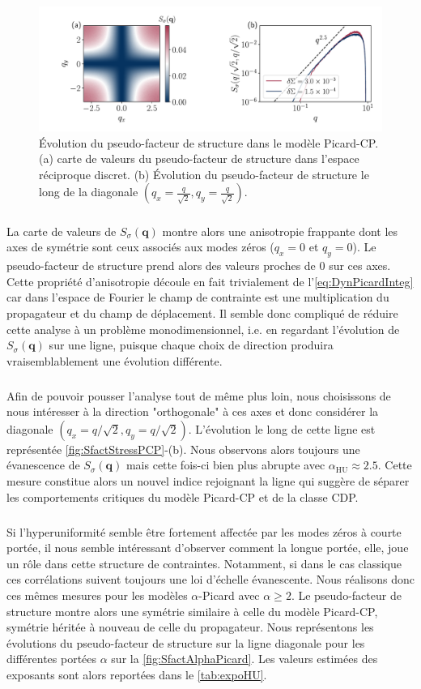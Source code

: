 \begin{figure}[h]
	\centering
	\includegraphics[width=\textwidth]{Chapitre4/Figures/Correlations/Sfact_SRP.pdf}
	\caption{Évolution du pseudo-facteur de structure dans le modèle Picard-CP. (a) carte de valeurs du pseudo-facteur de structure dans l'espace réciproque discret. (b) Évolution du pseudo-facteur de structure le long de la diagonale $(q_x=\frac{q}{\sqrt{2}},q_y=\frac{q}{\sqrt{2}})$.}
	\label{fig:SfactStressPCP}
\end{figure}

\subparagraph{}La carte de valeurs de $S_\sigma(\mathbf{q})$ montre alors une anisotropie frappante dont les axes de symétrie sont ceux associés aux modes zéros ($q_x=0$ et $q_y=0$). Le pseudo-facteur de structure prend alors des valeurs proches de 0 sur ces axes. Cette propriété d'anisotropie découle en fait trivialement de l'\autoref{eq:DynPicardInteg} car dans l'espace de Fourier le champ de contrainte est une multiplication du propagateur et du champ de déplacement. Il semble donc compliqué de réduire cette analyse à un problème monodimensionnel, i.e. en regardant l'évolution de $S_\sigma(\mathbf{q})$ sur une ligne, puisque chaque choix de direction produira vraisemblablement une évolution différente.

\subparagraph{}Afin de pouvoir pousser l'analyse tout de même plus loin, nous choisissons de nous intéresser à la direction "orthogonale" à ces axes et donc considérer la diagonale $(q_x = q/\sqrt{2}, q_y = q/\sqrt{2})$. L'évolution le long de cette ligne est représentée \autoref{fig:SfactStressPCP}-(b). Nous observons alors toujours une évanescence de $S_\sigma(\mathbf{q})$ mais cette fois-ci bien plus abrupte avec $\alpha_\text{HU} \approx 2.5$. Cette mesure constitue alors un nouvel indice rejoignant la ligne qui suggère de séparer les comportements critiques du modèle Picard-CP et de la classe CDP.

\subparagraph{}Si l'hyperuniformité semble être fortement affectée par les modes zéros à courte portée, il nous semble intéressant d'observer comment la longue portée, elle, joue un rôle dans cette structure de contraintes. Notamment, si dans le cas classique ces corrélations suivent toujours une loi d'échelle évanescente. Nous réalisons donc ces mêmes mesures pour les modèles $\alpha$-Picard avec $\alpha \geq 2$. Le pseudo-facteur de structure montre alors une symétrie similaire à celle du modèle Picard-CP, symétrie héritée à nouveau de celle du propagateur. Nous représentons les évolutions du pseudo-facteur de structure sur la ligne diagonale pour les différentes portées $\alpha$ sur la \autoref{fig:SfactAlphaPicard}. Les valeurs estimées des exposants sont alors reportées dans le \autoref{tab:expoHU}.

